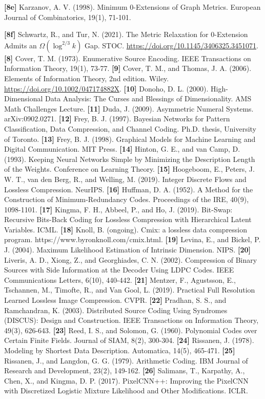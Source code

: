\documentclass[
]{article}
\begin{document}
\textbf{{[}8e{]}} Karzanov, A. V. (1998). Minimum 0-Extensions of Graph
Metrics. European Journal of Combinatorics, 19(1), 71-101.

\textbf{{[}8f{]}} Schwartz, R., and Tur, N. (2021). The
Metric Relaxation for $0$-Extension Admits an $\Omega(\log^{2/3} k)$ Gap.
STOC. \url{https://doi.org/10.1145/3406325.3451071}.
\textbf{{[}8{]}} Cover, T. M. (1973). Enumerative Source Encoding. IEEE
Transactions on Information Theory, 19(1), 73-77.
\textbf{{[}9{]}} Cover, T. M., and
Thomas, J. A. (2006). Elements of Information Theory, 2nd edition. Wiley.
\url{https://doi.org/10.1002/047174882X}.
\textbf{{[}10{]}} Donoho, D. L. (2000). High-Dimensional Data Analysis:
The Curses and Blessings of Dimensionality. AMS Math Challenges Lecture.
\textbf{{[}11{]}} Duda, J. (2009). Asymmetric Numeral Systems.
arXiv:0902.0271.
\textbf{{[}12{]}} Frey, B. J. (1997). Bayesian Networks for Pattern
Classification, Data Compression, and Channel Coding. Ph.D. thesis,
University of Toronto.
\textbf{{[}13{]}} Frey, B. J. (1998). Graphical Models for Machine
Learning and Digital Communication. MIT Press.
\textbf{{[}14{]}} Hinton, G. E., and van Camp, D. (1993). Keeping Neural
Networks Simple by Minimizing the Description Length of the Weights.
Conference on Learning Theory.
\textbf{{[}15{]}} Hoogeboom, E., Peters, J. W. T., van den Berg, R., and
Welling, M. (2019). Integer Discrete Flows and Lossless Compression.
NeurIPS.
\textbf{{[}16{]}} Huffman, D. A. (1952). A Method for the Construction
of Minimum-Redundancy Codes. Proceedings of the IRE, 40(9), 1098-1101.
\textbf{{[}17{]}} Kingma, F. H., Abbeel, P., and Ho, J. (2019).
Bit-Swap: Recursive Bits-Back Coding for Lossless Compression with
Hierarchical Latent Variables. ICML.
\textbf{{[}18{]}} Knoll, B. (ongoing). Cmix: a lossless data compression
program. https://www.byronknoll.com/cmix.html.
\textbf{{[}19{]}} Levina, E., and Bickel, P. J. (2004). Maximum
Likelihood Estimation of Intrinsic Dimension. NIPS.
\textbf{{[}20{]}} Liveris, A. D., Xiong, Z., and Georghiades, C. N.
(2002). Compression of Binary Sources with Side Information at the
Decoder Using LDPC Codes. IEEE Communications Letters, 6(10), 440-442.
\textbf{{[}21{]}} Mentzer, F., Agustsson, E., Tschannen, M., Timofte,
R., and Van Gool, L. (2019). Practical Full Resolution Learned Lossless
Image Compression. CVPR.
\textbf{{[}22{]}} Pradhan, S. S., and Ramchandran, K. (2003).
Distributed Source Coding Using Syndromes (DISCUS): Design and
Construction. IEEE Transactions on Information Theory, 49(3), 626-643.
\textbf{{[}23{]}} Reed, I. S., and Solomon, G. (1960). Polynomial Codes
over Certain Finite Fields. Journal of SIAM, 8(2), 300-304.
\textbf{{[}24{]}} Rissanen, J. (1978). Modeling by Shortest Data
Description. Automatica, 14(5), 465-471.
\textbf{{[}25{]}} Rissanen, J., and Langdon, G. G. (1979). Arithmetic
Coding. IBM Journal of Research and Development, 23(2), 149-162.
\textbf{{[}26{]}} Salimans, T., Karpathy, A., Chen, X., and Kingma, D.
P. (2017). PixelCNN++: Improving the PixelCNN with Discretized Logistic
Mixture Likelihood and Other Modifications. ICLR.
\end{document}

